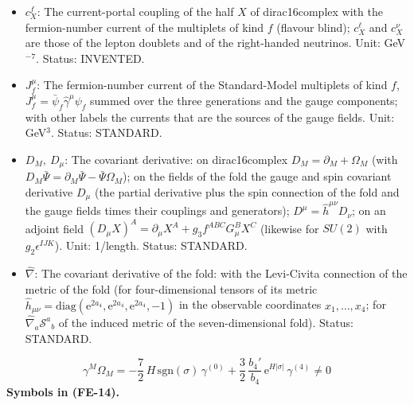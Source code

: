 \documentclass[
  10pt,
]{article}
\begin{document}
\begin{itemize}
  Status: STANDARD.
\item
  \(c^{f}_X\): The current-portal coupling of the half \(X\) of
  dirac16complex with the fermion-number current of the multiplets of
  kind \(f\) (flavour blind); \(c^{\ell}_X\) and \(c^{\nu}_X\) are those
  of the lepton doublets and of the right-handed neutrinos. Unit:
  GeV\(^{-7}\). Status: INVENTED.
\item
  \(J_f^\mu\): The fermion-number current of the Standard-Model
  multiplets of kind \(f\), \(J_f^\mu = \bar\psi_f\hat\gamma^\mu\psi_f\)
  summed over the three generations and the gauge components; with other
  labels the currents that are the sources of the gauge fields. Unit:
  GeV\(^3\). Status: STANDARD.
\item
  \(D_M,\ D_\mu\): The covariant derivative: on dirac16complex
  \(D_M = \partial_M + \Omega_M\) (with
  \(D_M\bar\Psi = \partial_M\bar\Psi - \bar\Psi\Omega_M\)); on the
  fields of the fold the gauge and spin covariant derivative \(D_\mu\)
  (the partial derivative plus the spin connection of the fold and the
  gauge fields times their couplings and generators);
  \(D^\mu = \hat h^{\mu\nu}D_\nu\); on an adjoint field
  \((D_\mu X)^A = \partial_\mu X^A + g_3f^{ABC}G^B_\mu X^C\) (likewise
  for \(SU(2)\) with \(g_2\epsilon^{IJK}\)). Unit: 1/length. Status:
  STANDARD.
\item
  \(\hat\nabla\): The covariant derivative of the fold: with the
  Levi-Civita connection of the metric of the fold (for four-dimensional
  tensors of its metric
  \(\hat h_{\mu\nu} = \mathrm{diag}(\mathrm{e}^{2a_4}, \mathrm{e}^{2a_4}, \mathrm{e}^{2a_4}, -1)\)
  in the observable coordinates \(x_1, \dots, x_4\); for
  \(\hat\nabla_a\mathcal{S}^a{}_b\) of the induced metric of the
  seven-dimensional fold). Status: STANDARD.
\end{itemize}

\[
\gamma^M\Omega_M = -\frac72\,H\,\mathrm{sgn}(\sigma)\,\gamma^{(0)} + \frac32\,\frac{b_4'}{b_4}\,\mathrm{e}^{H\lvert\sigma\rvert}\,\gamma^{(4)} \ne 0 \tag{FE-14}
\] \textbf{Symbols in (FE-14).}
\end{document}
